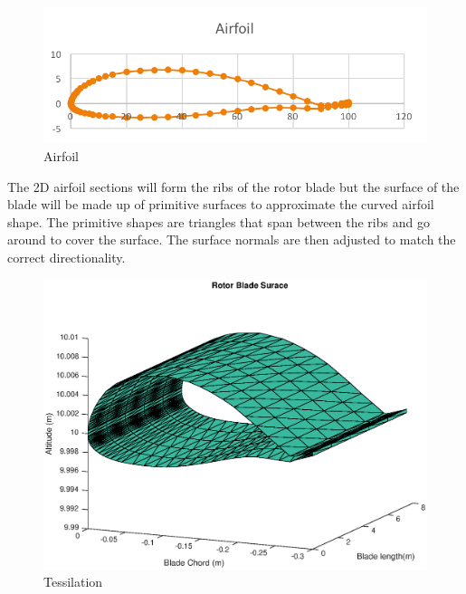 \begin{figure}
	\begin{center}
		\includegraphics[width=15cm]{images/radio_propagation/2d_airfoil.png}
		\caption{Airfoil}
		\label{fig:airfoil}
	\end{center}
\end{figure}

The 2D airfoil sections will form the ribs of the rotor blade but the surface of the blade will be made up of primitive surfaces to approximate the curved airfoil shape. The primitive shapes are triangles that span between the ribs and go around to cover the surface. The surface normals are then adjusted to match the correct directionality.

\begin{figure}
	\begin{center}
		\includegraphics[width=15cm]{images/radio_propagation/blade_surface_tesselation.eps}
		\caption{Tessilation}
		\label{fig:tessilation}
	\end{center}
\end{figure}

